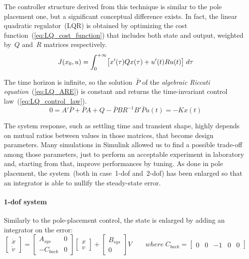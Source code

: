 
The controller structure derived from this technique is similar to the pole placement one, but a significant conceptual difference exists. In fact, the linear quadratic regulator~(LQR) is obtained by optimizing the cost function~(\ref{eq:LQ_cost_function}) that includes both state and output, weighted by~$Q$ and~$R$ matrices respectively.
\begin{equation}
	J(x_0, u) = \int_{0}^{+\infty} \bigl{[} x'(\tau)Qx(\tau) + u'(t)Ru(t) \bigr{]} \; d\tau
	\label{eq:LQ_cost_function}
\end{equation}

The time horizon is infinite, so the solution~$\bar{P}$ of the \textit{algebraic Riccati equation}~(\ref{eq:LQ_ARE}) is constant and returns the time-invariant control law~(\ref{eq:LQ_control_law}).
\begin{subequations}
	\begin{equation}
		0 = A' \bar{P} + \bar{P} A + Q - \bar{P} B R^{-1} B' \bar{P}
		\label{eq:LQ_ARE}
	\end{equation}
	\begin{equation}
		u(t) = -K x(t)
		\label{eq:LQ_control_law}
	\end{equation}
\end{subequations}

The system response, such as settling time and transient shape, highly depends on mutual ratios between values in those matrices, that become design parameters. Many simulations in Simulink allowed us to find a possible trade-off among those parameters, just to perform an acceptable experiment in laboratory and, starting from that, improve performances by tuning.
As done in pole placement, the system~(both in case~\acrshort{1-dof} and~\acrshort{2-dof}) has been enlarged so that an integrator is able to nullify the steady-state error.

\paragraph{\acrshort{1-dof} system}

Similarly to the pole-placement control, the state is enlarged by adding an integrator on the error:
\begin{equation}
	\begin{bmatrix}
		\dot{x} \\
		\dot{v}
	\end{bmatrix}
	=
	\begin{bmatrix}
		A_{sys} & 0 \\
		-C_{back} & 0
	\end{bmatrix}
	\begin{bmatrix}
		x \\
		v
	\end{bmatrix}
	+
	\begin{bmatrix}
		B_{sys} \\
		0
	\end{bmatrix}
	V
	\qquad
	where \; C_{back} =
	\begin{bmatrix}
		0 & 0 & -1 & 0 & 0
	\end{bmatrix}
\end{equation}


